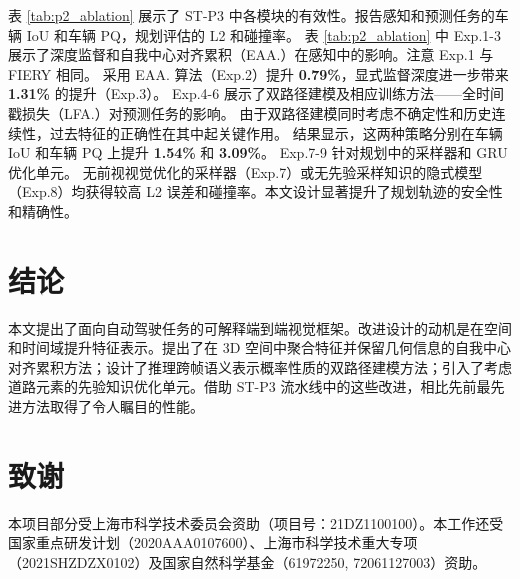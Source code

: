 \documentclass[runningheads]{llncs}
\begin{document}
表 \ref{tab:p2_ablation} 展示了 ST-P3 中各模块的有效性。报告感知和预测任务的车辆 IoU 和车辆 PQ，规划评估的 L2 和碰撞率。
%
表 \ref{tab:p2_ablation} 中 Exp.1-3 展示了深度监督和自我中心对齐累积（EAA.）在感知中的影响。注意 Exp.1 与 FIERY\cite{hu2021fiery} 相同。
%
采用 EAA. 算法（Exp.2）提升 \textbf{0.79\%}，显式监督深度进一步带来 \textbf{1.31\%} 的提升（Exp.3）。
%
Exp.4-6 展示了双路径建模及相应训练方法——全时间戳损失（LFA.）对预测任务的影响。
%
由于双路径建模同时考虑不确定性和历史连续性，过去特征的正确性在其中起关键作用。
%
结果显示，这两种策略分别在车辆 IoU 和车辆 PQ 上提升 \textbf{1.54\%} 和 \textbf{3.09\%}。
%
Exp.7-9 针对规划中的采样器和 GRU 优化单元。
%
无前视视觉优化的采样器（Exp.7）或无先验采样知识的隐式模型（Exp.8）均获得较高 L2 误差和碰撞率。本文设计显著提升了规划轨迹的安全性和精确性。



\section{结论}

本文提出了面向自动驾驶任务的可解释端到端视觉框架。改进设计的动机是在空间和时间域提升特征表示。提出了在 3D 空间中聚合特征并保留几何信息的自我中心对齐累积方法；设计了推理跨帧语义表示概率性质的双路径建模方法；引入了考虑道路元素的先验知识优化单元。借助 ST-P3 流水线中的这些改进，相比先前最先进方法取得了令人瞩目的性能。

\section*{致谢}
本项目部分受上海市科学技术委员会资助（项目号：21DZ1100100）。本工作还受国家重点研发计划（2020AAA0107600）、上海市科学技术重大专项（2021SHZDZX0102）及国家自然科学基金（61972250, 72061127003）资助。 


%
%



\clearpage
\appendix
{}

\end{document}
